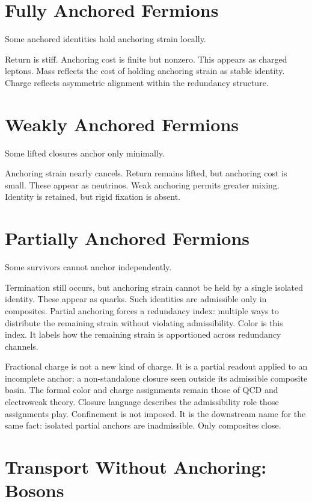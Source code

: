 \documentclass[11pt,twoside,openright]{book}
\begin{document}
\section*{Fully Anchored Fermions}

Some anchored identities hold anchoring strain locally.

Return is stiff. Anchoring cost is finite but nonzero. This appears as charged leptons. Mass reflects the cost of holding anchoring strain as stable identity. Charge reflects asymmetric alignment within the redundancy structure.

\section*{Weakly Anchored Fermions}

Some lifted closures anchor only minimally.

Anchoring strain nearly cancels. Return remains lifted, but anchoring cost is small. These appear as neutrinos. Weak anchoring permits greater mixing. Identity is retained, but rigid fixation is absent.

\section*{Partially Anchored Fermions}

Some survivors cannot anchor independently.

Termination still occurs, but anchoring strain cannot be held by a single isolated identity. These appear as quarks. Such identities are admissible only in composites. Partial anchoring forces a redundancy index: multiple ways to distribute the remaining strain without violating admissibility. Color is this index. It labels how the remaining strain is apportioned across redundancy channels.

Fractional charge is not a new kind of charge. It is a partial readout applied to an incomplete anchor: a non-standalone closure seen outside its admissible composite basin. The formal color and charge assignments remain those of QCD and electroweak theory. Closure language describes the admissibility role those assignments play. Confinement is not imposed. It is the downstream name for the same fact: isolated partial anchors are inadmissible. Only composites close.

\section*{Transport Without Anchoring: Bosons}
\end{document}

